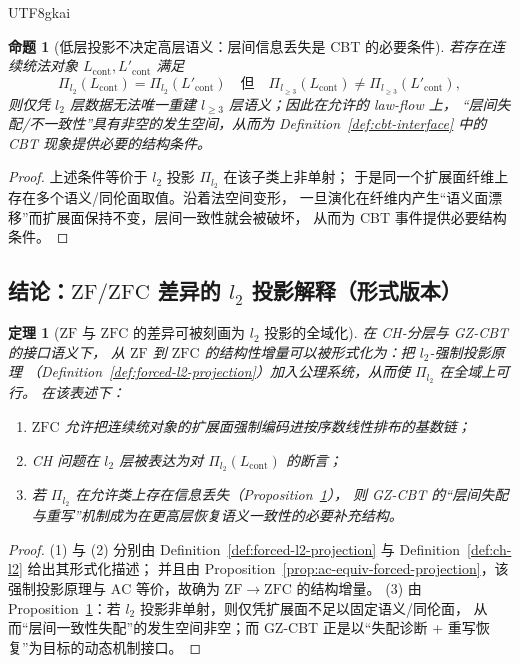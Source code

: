 \documentclass[12pt]{article}
\newtheorem{theorem}{定理}[section]
\newtheorem{proposition}{命题}[section]
\newcommand{\ZF}{\ensuremath{\mathrm{ZF}}}
\newcommand{\ZFC}{\ensuremath{\mathrm{ZFC}}}
\newcommand{\AC}{\ensuremath{\mathrm{AC}}}
\begin{document}
\begin{CJK*}{UTF8}{gkai}
\begin{proposition}[低层投影不决定高层语义：层间信息丢失是 CBT 的必要条件]
\label{prop:l2-not-determines-l3}
若存在连续统法对象 $L_{\mathrm{cont}},L'_{\mathrm{cont}}$ 满足
\[
  \Pi_{l_2}(L_{\mathrm{cont}})=\Pi_{l_2}(L'_{\mathrm{cont}})
  \quad\text{但}\quad
  \Pi_{l_{\ge 3}}(L_{\mathrm{cont}})\neq \Pi_{l_{\ge 3}}(L'_{\mathrm{cont}}),
\]
则仅凭 $l_2$ 层数据无法唯一重建 $l_{\ge 3}$ 层语义；因此在允许的 law-flow 上，
“层间失配/不一致性”具有非空的发生空间，从而为 Definition~\ref{def:cbt-interface} 中的 CBT 现象提供必要的结构条件。
\end{proposition}

\begin{proof}
上述条件等价于 $l_2$ 投影 $\Pi_{l_2}$ 在该子类上非单射；
于是同一个扩展面纤维上存在多个语义/同伦面取值。沿着法空间变形，
一旦演化在纤维内产生“语义面漂移”而扩展面保持不变，层间一致性就会被破坏，
从而为 CBT 事件提供必要结构条件。
\end{proof}

\subsection{结论：$\ZF/\ZFC$ 差异的 $l_2$ 投影解释（形式版本）}

\begin{theorem}[$\ZF$ 与 $\ZFC$ 的差异可被刻画为 $l_2$ 投影的全域化]
\label{thm:zfc-vs-zf-as-l2-projection}
在 CH-分层与 GZ-CBT 的接口语义下，
从 $\ZF$ 到 $\ZFC$ 的结构性增量可以被形式化为：把 $l_2$-强制投影原理
（Definition~\ref{def:forced-l2-projection}）加入公理系统，从而使 $\Pi_{l_2}$ 在全域上可行。
在该表述下：
\begin{enumerate}
  \item $\ZFC$ 允许把连续统对象的扩展面强制编码进按序数线性排布的基数链；
  \item CH 问题在 $l_2$ 层被表达为对 $\Pi_{l_2}(L_{\mathrm{cont}})$ 的断言；
  \item 若 $\Pi_{l_2}$ 在允许类上存在信息丢失（Proposition~\ref{prop:l2-not-determines-l3}），
        则 GZ-CBT 的“层间失配与重写”机制成为在更高层恢复语义一致性的必要补充结构。
\end{enumerate}
\end{theorem}

\begin{proof}
(1) 与 (2) 分别由 Definition~\ref{def:forced-l2-projection} 与 Definition~\ref{def:ch-l2} 给出其形式化描述；
并且由 Proposition~\ref{prop:ac-equiv-forced-projection}，该强制投影原理与 $\AC$ 等价，故确为 $\ZF\to\ZFC$ 的结构增量。
(3) 由 Proposition~\ref{prop:l2-not-determines-l3}：若 $l_2$ 投影非单射，则仅凭扩展面不足以固定语义/同伦面，
从而“层间一致性失配”的发生空间非空；而 GZ-CBT 正是以“失配诊断 + 重写恢复”为目标的动态机制接口。
\end{proof}


\end{CJK*}
\end{document}
